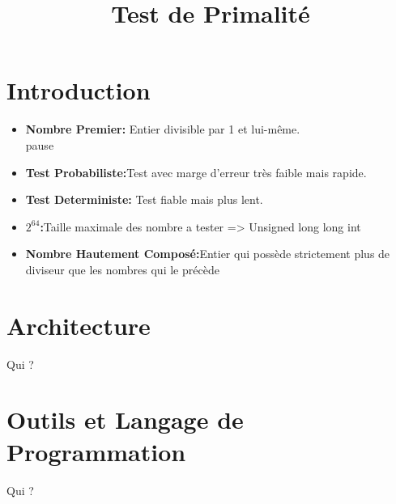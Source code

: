 
\usepackage{../tex/myInfolines}
\usepackage{longtable,array}
\title{Test de Primalité}


	\begin{frame}
		\titlepage
	\end{frame}
	
	\section*{Introduction}
        \begin{frame}
            \begin{itemize}
            \item \textbf{Nombre Premier:} Entier divisible par 1 et lui-même.\\pause
            \vspace{1em}            
            \item \textbf{Test Probabiliste:}Test avec marge d'erreur très faible mais rapide.  \\
            \vspace{1em}
            \item \textbf{ Test Deterministe:} Test fiable mais plus lent.    \\
            \vspace{1em}
            \item \textbf{$2^{64}$:}Taille maximale des nombre a tester => Unsigned long long int  \\
            \vspace{1em}
            \item \textbf{Nombre Hautement Composé:}Entier qui possède strictement plus de diviseur que les nombres qui le précède\\
            \end{itemize}            
        \end{frame}
	
	\begin{frame}
		\tableofcontents
	\end{frame}
	
	\section{Architecture}
		\begin{frame}
	Qui ?
		\end{frame}
		
	\section{{\small Outils et Langage de Programmation}}
		\begin{frame}
	Qui ?
		\end{frame}
		
